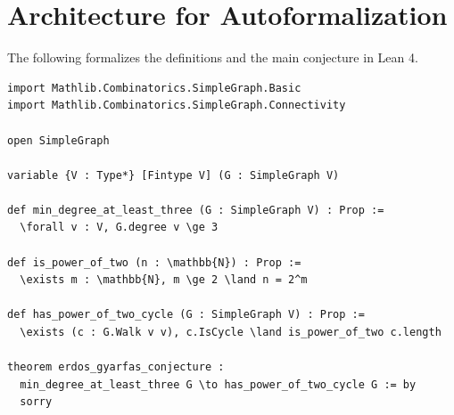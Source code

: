 \documentclass[11pt, a4paper]{article}
\begin{document}
\section{Architecture for Autoformalization}

The following formalizes the definitions and the main conjecture in Lean 4.

\begin{verbatim}
import Mathlib.Combinatorics.SimpleGraph.Basic
import Mathlib.Combinatorics.SimpleGraph.Connectivity

open SimpleGraph

variable {V : Type*} [Fintype V] (G : SimpleGraph V)

def min_degree_at_least_three (G : SimpleGraph V) : Prop :=
  \forall v : V, G.degree v \ge 3

def is_power_of_two (n : \mathbb{N}) : Prop :=
  \exists m : \mathbb{N}, m \ge 2 \land n = 2^m

def has_power_of_two_cycle (G : SimpleGraph V) : Prop :=
  \exists (c : G.Walk v v), c.IsCycle \land is_power_of_two c.length

theorem erdos_gyarfas_conjecture :
  min_degree_at_least_three G \to has_power_of_two_cycle G := by
  sorry
\end{verbatim}
\end{document}
